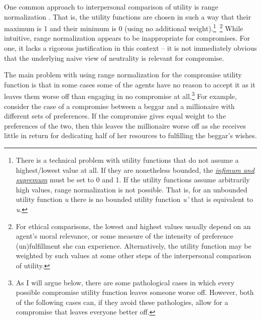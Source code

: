 One common approach to interpersonal comparison of utility is range
normalization \parencite{Isbell1959-ql,Hausman1995-ry}. That
is, the utility functions are chosen in such a way that their maximum is
1 and their minimum is 0 (using no additional weight).\footnote{There is
  a technical problem with utility functions that do not assume a
  highest/lowest value at all. If they are nonetheless bounded, the
  \href{https://en.wikipedia.org/wiki/Infimum_and_supremum}{\emph{infimum
  and supremum}} must be set to 0 and 1. If the utility functions assume
  arbitrarily high values, range normalization is not possible. That is,
  for an unbounded utility function \emph{u} there is no bounded utility
  function \emph{u'} that is equivalent to \emph{u}.}~\footnote{For
  ethical comparisons, the lowest and highest values usually depend on
  an agent's moral relevance, or some measure of the intensity of
  preference (un)fulfillment she can experience. Alternatively, the
  utility function may be weighted by such values at some other steps of
  the interpersonal comparison of utility.} While intuitive, range
normalization appears to be inappropriate for compromises. For one, it
lacks a rigorous justification in this context -- it is not immediately
obvious that the underlying naive view of neutrality is relevant for
compromise.

The main problem with using range normalization for the compromise
utility function is that in some cases some of the agents have no reason
to accept it as it leaves them worse off than engaging in no compromise
at all.\footnote{As I will argue below, there are some pathological
  cases in which every possible compromise utility function leaves
  someone worse off. However, both of the following cases can, if they
  avoid these pathologies, allow for a compromise that leaves everyone
  better off.} For example, consider the case of a compromise between a
beggar and a millionaire with different sets of preferences. If the
compromise gives equal weight to the preferences of the two, then this
leaves the millionaire worse off as she receives little in return for
dedicating half of her resources to fulfilling the beggar's wishes.

